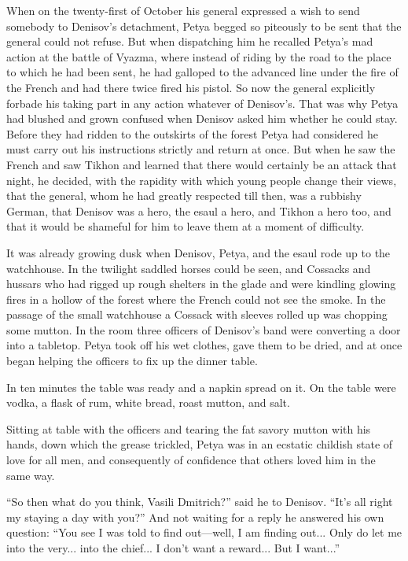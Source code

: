 When on the twenty-first of October his general expressed a wish
to send somebody to Denisov's detachment, Petya begged so
piteously to be sent that the general could not refuse. But when
dispatching him he recalled Petya's mad action at the battle of
Vyazma, where instead of riding by the road to the place to which
he had been sent, he had galloped to the advanced line under the
fire of the French and had there twice fired his pistol. So now
the general explicitly forbade his taking part in any action
whatever of Denisov's. That was why Petya had blushed and grown
confused when Denisov asked him whether he could stay. Before
they had ridden to the outskirts of the forest Petya had
considered he must carry out his instructions strictly and return
at once. But when he saw the French and saw Tikhon and learned
that there would certainly be an attack that night, he decided,
with the rapidity with which young people change their views,
that the general, whom he had greatly respected till then, was a
rubbishy German, that Denisov was a hero, the esaul a hero, and
Tikhon a hero too, and that it would be shameful for him to leave
them at a moment of difficulty.

It was already growing dusk when Denisov, Petya, and the esaul
rode up to the watchhouse. In the twilight saddled horses could
be seen, and Cossacks and hussars who had rigged up rough
shelters in the glade and were kindling glowing fires in a hollow
of the forest where the French could not see the smoke. In the
passage of the small watchhouse a Cossack with sleeves rolled up
was chopping some mutton. In the room three officers of Denisov's
band were converting a door into a tabletop.  Petya took off his
wet clothes, gave them to be dried, and at once began helping the
officers to fix up the dinner table.

In ten minutes the table was ready and a napkin spread on it. On
the table were vodka, a flask of rum, white bread, roast mutton,
and salt.

Sitting at table with the officers and tearing the fat savory
mutton with his hands, down which the grease trickled, Petya was
in an ecstatic childish state of love for all men, and
consequently of confidence that others loved him in the same way.

``So then what do you think, Vasili Dmitrich?'' said he to
Denisov. ``It's all right my staying a day with you?'' And not
waiting for a reply he answered his own question: ``You see I was
told to find out---well, I am finding out... Only do let me into
the very... into the chief... I don't want a reward... But I
want...''

